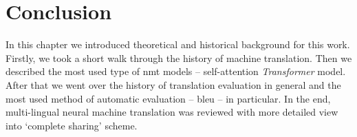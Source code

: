 \section{Conclusion}

In this chapter we introduced theoretical and historical background for this work.
Firstly, we took a short walk through the history of machine translation.
Then we described the most used type of \acrshort{nmt} models --
self-attention \textit{Transformer} model.
After that we went over the history of translation evaluation in general and the most
used method of automatic evaluation -- \acrshort{bleu} -- in particular.
In the end, multi-lingual neural machine translation was reviewed
with more detailed view into `complete sharing' scheme.
